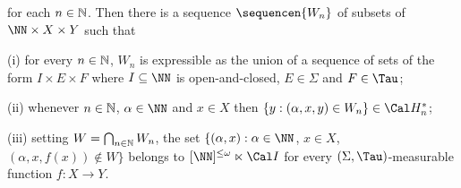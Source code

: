 
\noindent for each $n\in\Bbb N$.   Then there is a sequence
$\sequencen{W_n}$ of subsets of $\NN\times X\times Y$ such that

(i) for every $n\in\Bbb N$, $W_n$ is expressible as the union of a
sequence of sets of the form $I\times E\times F$ where $I\subseteq\NN$
is open-and-closed, $E\in\Sigma$ and $F\in\Tau$;

(ii) whenever $n\in\Bbb N$, $\alpha\in\NN$ and $x\in X$ then
$\{y:(\alpha,x,y)\in W_n\}\in\Cal H_n^*$;

(iii) setting $W=\bigcap_{n\in\Bbb N}W_n$, the set
$\{(\alpha,x):\alpha\in\NN$, $x\in X$, $(\alpha,x,f(x))\notin W\}$
belongs to $[\NN]^{\le\omega}\ltimes\Cal I$ for every
$(\Sigma,\Tau)$-measurable function $f:X\to Y$.

